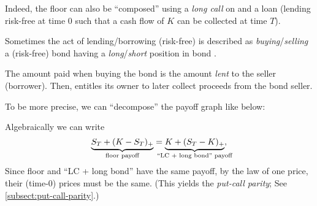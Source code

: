 \begin{enumerate}
Indeed, the floor can also be ``composed'' using a \emph{long call} on
 and a loan (lending  risk-free at time
0 such that a cash flow of \(K\) can be collected at time \(T\)).

\begin{note}
Sometimes the act of lending/borrowing  (risk-free) is
described as \emph{buying}/\emph{selling} a (risk-free) bond 
 having a \emph{long}/\emph{short} position in bond
.

The amount paid when buying the bond  is the amount \emph{lent}
to the seller (borrower). Then,  entitles its owner to later
collect proceeds from the bond seller.
\end{note}

To be more precise, we can ``decompose'' the payoff graph like below:

\begin{center}
\end{center}
Algebraically we can write
\[
\underbrace{S_T+(K-S_T)_{+}}_{\text{floor payoff}}
=\underbrace{K+(S_T-K)_{+}}_{\mathclap{\text{``LC + long bond'' payoff}}},
\]
Since floor and ``LC + long bond'' have the same payoff, by the law of one
price, their (time-0) prices must be the same. (This yields the \emph{put-call
parity}; See \cref{subsect:put-call-parity}.)
\end{enumerate}
